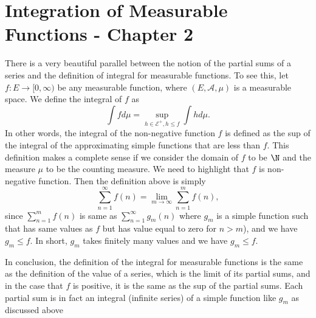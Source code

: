 \chapter{Integration of Measurable Functions - Chapter 2}

\begin{remark}
	There is a very beautiful parallel between the notion of the partial sums of a series and the definition of integral for measurable functions. To see this, let $ f: E \to [0,\infty) $ be any measurable function, where $ (E,\mathcal{A}, \mu) $ is a measurable space. We define the integral of $ f $ as 
	\[ \int f d\mu = \sup_{h\in\mathcal{E}^+, h\leq f} \int h d\mu. \]
	In other words, the integral of the non-negative function $ f $ is defined as the sup of the integral of the approximating simple functions that are less than $ f $. This definition makes a complete sense if we consider the domain of $ f $ to be $ \N $ and the measure $ \mu $ to be the counting measure. We need to highlight that $ f $ is non-negative function. Then the definition above is simply
	\[ \sum_{n=1}^{\infty}f(n) = \lim_{m\to\infty} \sum_{n=1}^m f(n), \]
	since $ \sum_{n=1}^{m} f(n) $ is same as $ \sum_{n=1}^{\infty} g_m(n) $ where $ g_m $ is a simple function such that has same values as $ f $ but has value equal to zero for $ n>m $), and we have $ g_m\leq f $. In short, $ g_m $ takes finitely many values and we have $ g_m\leq f $. 
	
	In conclusion, the definition of the integral for measurable functions is the same as the definition of the value of a series, which is the limit of its partial sums, and in the case that $ f $ is positive, it is the same as the sup of the partial sums. Each partial sum is in fact an integral (infinite series) of a simple function like $ g_m $ as discussed above
\end{remark}